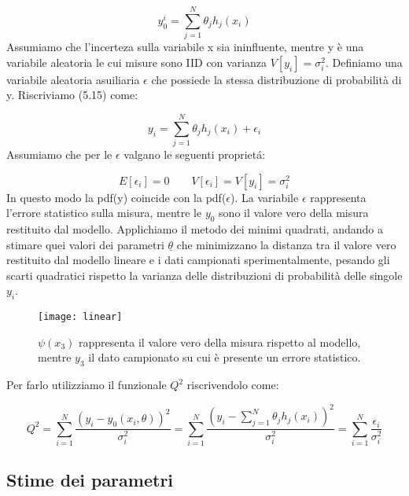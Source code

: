 \begin{equation}
	y_{0}^{i} = \sum_{j = 1}^N \theta_{j}h_{j}(x_i)
\end{equation}
Assumiamo che l'incerteza sulla variabile x sia ininfluente, mentre y \`{e} una variabile aleatoria le cui misure sono IID con varianza $V[y_i] = \sigma_i^2$. Definiamo una variabile aleatoria asuiliaria $\epsilon$ che possiede la stessa distribuzione di probabilit\`{a} di y. Riscriviamo (5.15) come:

\begin{equation}
	y_i = \sum_{j = 1}^N \theta_{j}h_{j}(x_i) + \epsilon_i
\end{equation}
Assumiamo che per le $\epsilon$ valgano le seguenti propriet\'{a}:

\begin{equation*}
	E[\epsilon_i] = 0 \quad \quad V[\epsilon_i]= V[y_i] = \sigma_i^2
\end{equation*}
In questo modo la pdf(y) coincide con la pdf($\epsilon$). La variabile $\epsilon$ rappresenta l'errore statistico sulla misura, mentre le $y_0$ sono il valore vero della misura restituito dal modello.
\newline
Applichiamo il metodo dei minimi quadrati, andando a stimare quei valori dei parametri $\underline{\theta}$ che minimizzano la distanza tra il valore vero restituito dal modello lineare e i dati campionati sperimentalmente, pesando gli scarti quadratici rispetto la varianza delle distribuzioni di probabilit\`{a} delle singole $y_i$.

\newpage

 
\begin{figure}[ht]
\vspace{0.2in}
\texttt{[image: linear]}	
\centering
\vspace{0.2in}
\caption{$\psi(x_3)$ rappresenta il valore vero della misura rispetto al modello, mentre $y_3$ il dato campionato su cui \`{e} presente un errore statistico.}
\end{figure}

\noindent Per farlo utilizziamo il funzionale $Q^2$ riscrivendolo come:

\begin{equation}
	Q^2 = \sum_{i=1}^N \dfrac{(y_i - y_0(x_i, \theta))^2}{\sigma_i^2} = \sum_{i=1}^N \dfrac{(y_i - \sum_{j=1}^N \theta_j h_j(x_i))^2}{\sigma_i^2} = \sum_{i=1}^N \dfrac{\epsilon_i}{\sigma^2_i} 
\end{equation}

\subsection{Stime dei parametri}

